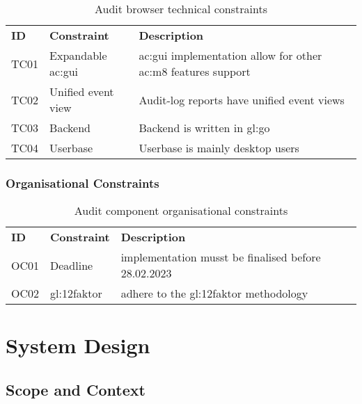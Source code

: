 \begin{table}[H]
  \begin{center}
    \caption{Audit browser technical constraints}
    \label{tab:abtc}
    \def\arraystretch{1.5}
    \begin{tabularx}{\linewidth}{|l l X |}
      \hline
      \rowcolor{gray!20}
      \textbf{ID} & \textbf{Constraint} & \textbf{Description}\\
      TC01 & Expandable \gls{ac:gui} & \gls{ac:gui} implementation allow for other \gls{ac:m8} features support\\
      TC02 & Unified event view & Audit-log reports have unified event views\\
      TC03\label{tc:ab03} & Backend & Backend is written in \gls{gl:go}\\
      TC04\label{tc:ab04} & Userbase & Userbase is mainly desktop users\\
      \hline
    \end{tabularx}
  \end{center}
\end{table}

\subsubsection{Organisational Constraints}

\begin{table}[H]
  \begin{center}
    \caption{Audit component organisational constraints}
    \label{tab:acoc}
    \def\arraystretch{1.5}
    \begin{tabularx}{\linewidth}{|l l X |}
      \hline
      \rowcolor{gray!20}
      \textbf{ID} & \textbf{Constraint} & \textbf{Description}\\
      OC01 & Deadline & implementation musst be finalised before 28.02.2023\\
      OC02 & \gls{gl:12faktor} & adhere to the \gls{gl:12faktor} methodology\\
      \hline
    \end{tabularx}
  \end{center}
\end{table}

\section{System Design}

\subsection{Scope and Context}

